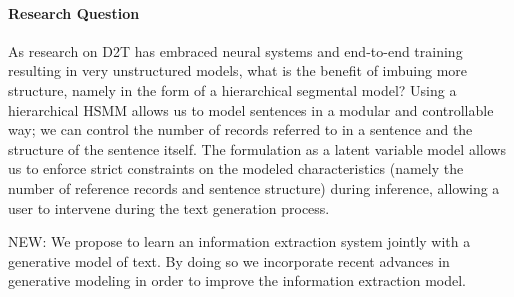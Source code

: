 \documentclass[11pt]{article}
\begin{document}
\paragraph{Research Question}
As research on D2T has embraced neural systems and end-to-end training resulting
in very unstructured models, what is the benefit of imbuing more structure, namely in the
form of a hierarchical segmental model?
Using a hierarchical HSMM allows us to model
sentences in a modular and controllable way;
we can control the number of records referred to in a sentence and 
the structure of the sentence itself.
The formulation as a latent variable model allows us to enforce strict constraints on
the modeled characteristics (namely the number of reference records and sentence structure)
during inference, allowing a user to intervene during the text generation process.

NEW: We propose to learn an information extraction system jointly with a 
generative model of text.
By doing so we incorporate recent advances in generative modeling
in order to improve the information extraction model.
\end{document}
